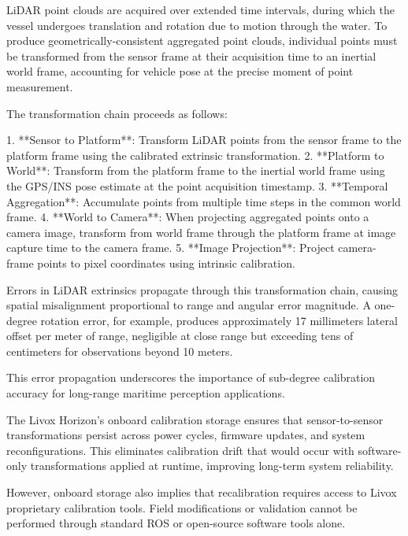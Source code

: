 LiDAR point clouds are acquired over extended time intervals, during which the vessel undergoes translation and rotation due to motion through the water.
To produce geometrically-consistent aggregated point clouds, individual points must be transformed from the sensor frame at their acquisition time to an inertial world frame, accounting for vehicle pose at the precise moment of point measurement.

The transformation chain proceeds as follows:

1. **Sensor to Platform**: Transform LiDAR points from the sensor frame to the platform frame using the calibrated extrinsic transformation.
2. **Platform to World**: Transform from the platform frame to the inertial world frame using the GPS/INS pose estimate at the point acquisition timestamp.
3. **Temporal Aggregation**: Accumulate points from multiple time steps in the common world frame.
4. **World to Camera**: When projecting aggregated points onto a camera image, transform from world frame through the platform frame at image capture time to the camera frame.
5. **Image Projection**: Project camera-frame points to pixel coordinates using intrinsic calibration.

Errors in LiDAR extrinsics propagate through this transformation chain, causing spatial misalignment proportional to range and angular error magnitude.
A one-degree rotation error, for example, produces approximately 17 millimeters lateral offset per meter of range, negligible at close range but exceeding tens of centimeters for observations beyond 10 meters.

This error propagation underscores the importance of sub-degree calibration accuracy for long-range maritime perception applications.


The Livox Horizon's onboard calibration storage ensures that sensor-to-sensor transformations persist across power cycles, firmware updates, and system reconfigurations.
This eliminates calibration drift that would occur with software-only transformations applied at runtime, improving long-term system reliability.

However, onboard storage also implies that recalibration requires access to Livox proprietary calibration tools.
Field modifications or validation cannot be performed through standard ROS or open-source software tools alone.


